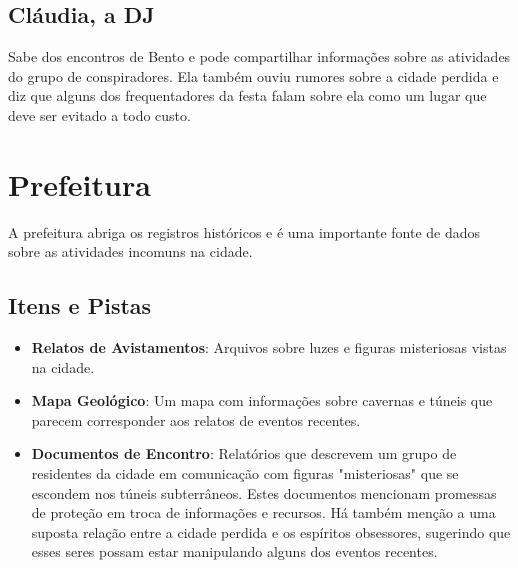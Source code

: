 \begin{personagem}
\subsection{Cláudia, a DJ} Sabe dos encontros de Bento e pode compartilhar informações sobre as atividades do grupo de conspiradores. Ela também ouviu rumores sobre a cidade perdida e diz que alguns dos frequentadores da festa falam sobre ela como um lugar que deve ser evitado a todo custo.
\end{personagem}



\section{Prefeitura}

A prefeitura abriga os registros históricos e é uma importante fonte de dados sobre as atividades incomuns na cidade.

\subsection{Itens e Pistas}

\begin{itemize}
    \item \textbf{Relatos de Avistamentos}: Arquivos sobre luzes e figuras misteriosas vistas na cidade.
    \item \textbf{Mapa Geológico}: Um mapa com informações sobre cavernas e túneis que parecem corresponder aos relatos de eventos recentes.
    \item \textbf{Documentos de Encontro}: Relatórios que descrevem um grupo de residentes da cidade em comunicação com figuras "misteriosas" que se escondem nos túneis subterrâneos. Estes documentos mencionam promessas de proteção em troca de informações e recursos. Há também menção a uma suposta relação entre a cidade perdida e os espíritos obsessores, sugerindo que esses seres possam estar manipulando alguns dos eventos recentes.
\end{itemize}


